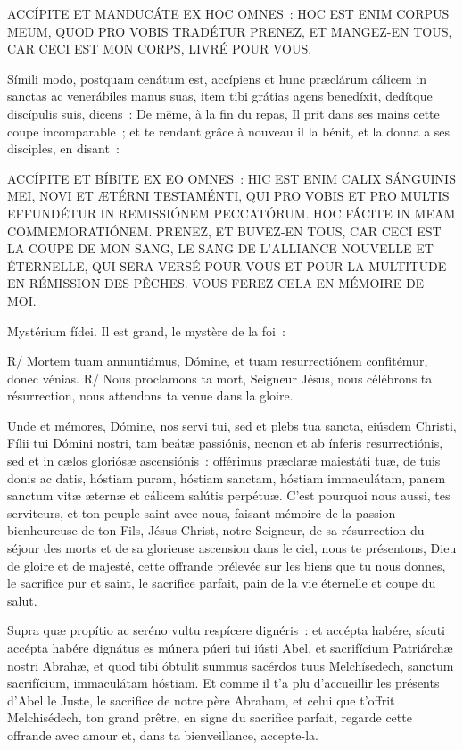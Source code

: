 \begin{paracol}{2}
\LigneParacol{0cm}
{ACCÍPITE ET MANDUCÁTE EX HOC OMNES~: HOC EST ENIM CORPUS MEUM, QUOD PRO VOBIS TRADÉTUR}
{PRENEZ, ET MANGEZ-EN TOUS, CAR CECI EST MON CORPS, LIVRÉ POUR VOUS.}

\LigneParacol{0cm}
{Símili modo, postquam cenátum est, accípiens et hunc præclárum cálicem in sanctas ac venerábiles manus suas, item tibi grátias agens benedíxit, dedítque discípulis suis, dicens~:}
{De même, à la fin du repas, Il prit dans ses mains cette coupe incomparable~; et te rendant grâce à nouveau il la bénit, et la donna a ses disciples, en disant~:}

\LigneParacol{0cm}
{ACCÍPITE ET BÍBITE EX EO OMNES~: HIC EST ENIM CALIX SÁNGUINIS MEI, NOVI ET ÆTÉRNI TESTAMÉNTI, QUI PRO VOBIS ET PRO MULTIS EFFUNDÉTUR IN REMISSIÓNEM PECCATÓRUM. HOC FÁCITE IN MEAM COMMEMORATIÓNEM.}
{PRENEZ, ET BUVEZ-EN TOUS, CAR CECI EST LA COUPE DE MON SANG, LE SANG DE L'ALLIANCE NOUVELLE ET ÉTERNELLE, QUI SERA VERSÉ POUR VOUS ET POUR LA MULTITUDE EN RÉMISSION DES PÊCHES. VOUS FEREZ CELA EN MÉMOIRE DE MOI.}

\LigneParacol{0cm}
{Mystérium fídei.}
{Il est grand, le mystère de la foi~:}

\LigneParacol{0cm}
{R/ Mortem tuam annuntiámus, Dómine, et tuam resurrectiónem confitémur, donec vénias.}
{R/ Nous proclamons ta mort, Seigneur Jésus, nous célébrons ta résurrection, nous attendons ta venue dans la gloire.}

\LigneParacol{0cm}
{Unde et mémores, Dómine, nos servi tui, sed et plebs tua sancta, eiúsdem Christi, Fílii tui Dómini nostri, tam beátæ passiónis, necnon et ab ínferis resurrectiónis, sed et in cælos gloriósæ ascensiónis~: offérimus præclaræ maiestáti tuæ, de tuis donis ac datis, hóstiam puram, hóstiam sanctam, hóstiam immaculátam, panem sanctum vitæ æternæ et cálicem salútis perpétuæ.}
{C'est pourquoi nous aussi, tes serviteurs, et ton peuple saint avec nous, faisant mémoire de la passion bienheureuse de ton Fils, Jésus Christ, notre Seigneur, de sa résurrection du séjour des morts et de sa glorieuse ascension dans le ciel, nous te présentons, Dieu de gloire et de majesté, cette offrande prélevée sur les biens que tu nous donnes, le sacrifice pur et saint, le sacrifice parfait, pain de la vie éternelle et coupe du salut.}

\LigneParacol{0cm}
{Supra quæ propítio ac seréno vultu respícere dignéris~: et accépta habére, sícuti accépta habére dignátus es múnera púeri tui iústi Abel, et sacrifícium Patriárchæ nostri Abrahæ, et quod tibi óbtulit summus sacérdos tuus Melchísedech, sanctum sacrifícium, immaculátam hóstiam.}
{Et comme il t'a plu d'accueillir les présents d'Abel le Juste, le sacrifice de notre père Abraham, et celui que t'offrit Melchisédech, ton grand prêtre, en signe du sacrifice parfait, regarde cette offrande avec amour et, dans ta bienveillance, accepte-la.}


\end{paracol}
